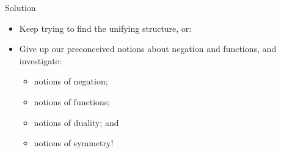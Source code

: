 \documentclass[svgnames,11pt]{beamer}
\newcommand{\red}[1]{{\color{red}{#1}}}
\begin{document}
\begin{frame}{Solution} 

\begin{itemize}

\vfill\item Keep trying to find the unifying structure, or:

\pause

\vfill\item Give up our preconceived notions about negation and functions,
and investigate:
\begin{itemize}
\vfill\item \red{two} notions of negation; 
\vfill\item \red{two} notions of functions; 
\vfill\item \red{two} notions of duality; and 
\vfill\item \red{two} notions of symmetry!
\end{itemize}

\end{itemize}

\end{frame}
\end{document}
